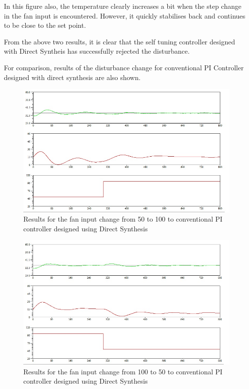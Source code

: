 In this figure also, the temperature clearly increases a bit when the step change in the fan input is encountered. However, 
it quickly stabilises back and continues to be close to the set point.

From the above two results, it is clear that the self tuning controller designed with Direct Syntheis has successfully 
rejected the disturbance.

For comparison, results of the disturbance change for conventional PI Controller designed with direct synthesis are also shown.
\newpage
\begin{figure}[h]
	\centering
\includegraphics[width=.7\linewidth]{Vikas_self/report_tex/PID_results/Conventional_Tuning/Fan_disturbance/Direct_Systhesis/step50to100.jpg}
	\caption{Results for the fan input change from 50 to 100 to conventional PI controller designed using Direct Synthesis}
\end{figure}

\begin{figure}[h]
	\centering
\includegraphics[width=.7\linewidth]{Vikas_self/report_tex/PID_results/Conventional_Tuning/Fan_disturbance/Direct_Systhesis/step100to50.jpg}
	\caption{Results for the fan input change from 100 to 50 to conventional PI controller designed using Direct Synthesis}
\end{figure}

\newpage
